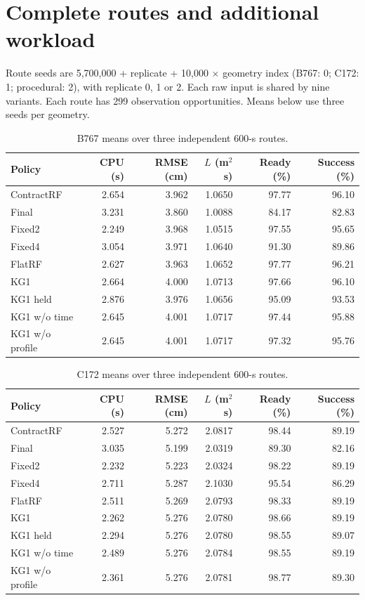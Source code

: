 \FloatBarrier
\section{Complete routes and additional workload}
Route seeds are 5,700,000 + replicate + 10,000 $\times$ geometry index (B767: 0; C172: 1; procedural: 2), with replicate 0, 1 or 2. Each raw input is shared by nine variants. Each route has 299 observation opportunities. Means below use three seeds per geometry.
\begin{table}[!htbp]\centering\footnotesize
\caption{B767 means over three independent 600-s routes.}\label{supp:routeB767}
\begin{tabular}{@{}lrrrrr@{}}\toprule
Policy & CPU (s) & RMSE (cm) & $L$ (m$^2$s) & Ready (\%) & Success (\%)\\\midrule
ContractRF & 2.654 & 3.962 & 1.0650 & 97.77 & 96.10\\
Final & 3.231 & 3.860 & 1.0088 & 84.17 & 82.83\\
Fixed2 & 2.249 & 3.968 & 1.0515 & 97.55 & 95.65\\
Fixed4 & 3.054 & 3.971 & 1.0640 & 91.30 & 89.86\\
FlatRF & 2.627 & 3.963 & 1.0652 & 97.77 & 96.21\\
KG1 & 2.664 & 4.000 & 1.0713 & 97.66 & 96.10\\
KG1 held & 2.876 & 3.976 & 1.0656 & 95.09 & 93.53\\
KG1 w/o time & 2.645 & 4.001 & 1.0717 & 97.44 & 95.88\\
KG1 w/o profile & 2.645 & 4.001 & 1.0717 & 97.32 & 95.76\\
\bottomrule\end{tabular}\end{table}

\begin{table}[!htbp]\centering\footnotesize
\caption{C172 means over three independent 600-s routes.}\label{supp:routeC172}
\begin{tabular}{@{}lrrrrr@{}}\toprule
Policy & CPU (s) & RMSE (cm) & $L$ (m$^2$s) & Ready (\%) & Success (\%)\\\midrule
ContractRF & 2.527 & 5.272 & 2.0817 & 98.44 & 89.19\\
Final & 3.035 & 5.199 & 2.0319 & 89.30 & 82.16\\
Fixed2 & 2.232 & 5.223 & 2.0324 & 98.22 & 89.19\\
Fixed4 & 2.711 & 5.287 & 2.1030 & 95.54 & 86.29\\
FlatRF & 2.511 & 5.269 & 2.0793 & 98.33 & 89.19\\
KG1 & 2.262 & 5.276 & 2.0780 & 98.66 & 89.19\\
KG1 held & 2.294 & 5.276 & 2.0780 & 98.55 & 89.07\\
KG1 w/o time & 2.489 & 5.276 & 2.0784 & 98.55 & 89.19\\
KG1 w/o profile & 2.361 & 5.276 & 2.0781 & 98.77 & 89.30\\
\bottomrule\end{tabular}\end{table}

